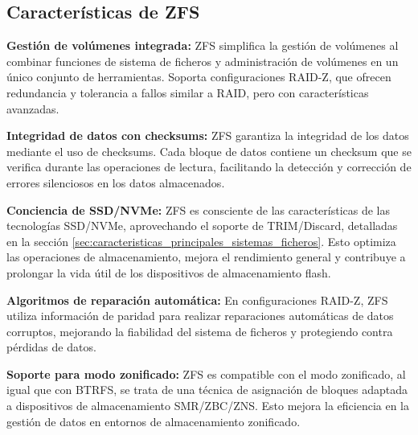 \subsection{Características de ZFS}

\textbf{Gestión de volúmenes integrada:} ZFS simplifica la gestión de volúmenes al combinar funciones de sistema de ficheros y administración de volúmenes en un único conjunto de herramientas. Soporta configuraciones RAID-Z, que ofrecen redundancia y tolerancia a fallos similar a RAID, pero con características avanzadas.\newline
    
\textbf{Integridad de datos con checksums:} ZFS garantiza la integridad de los datos mediante el uso de checksums. Cada bloque de datos contiene un checksum que se verifica durante las operaciones de lectura, facilitando la detección y corrección de errores silenciosos en los datos almacenados.\newline
    
\textbf{Conciencia de SSD/NVMe:} ZFS es consciente de las características de las tecnologías SSD/NVMe, aprovechando el soporte de TRIM/Discard, detalladas en la sección \ref{sec:caracteristicas_principales_sistemas_ficheros}. Esto optimiza las operaciones de almacenamiento, mejora el rendimiento general y contribuye a prolongar la vida útil de los dispositivos de almacenamiento flash.\newline
    
\textbf{Algoritmos de reparación automática:} En configuraciones RAID-Z, ZFS utiliza información de paridad para realizar reparaciones automáticas de datos corruptos, mejorando la fiabilidad del sistema de ficheros y protegiendo contra pérdidas de datos.\newline

\textbf{Soporte para modo zonificado:} ZFS es compatible con el modo zonificado, al igual que con BTRFS, se trata de una técnica de asignación de bloques adaptada a dispositivos de almacenamiento SMR/ZBC/ZNS. Esto mejora la eficiencia en la gestión de datos en entornos de almacenamiento zonificado.





